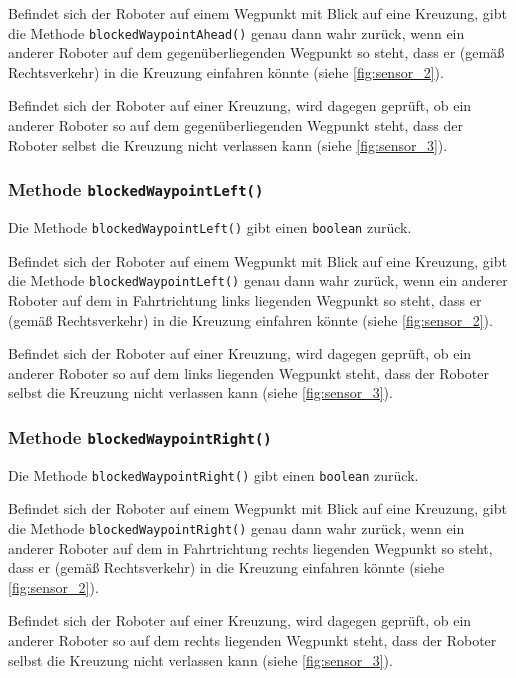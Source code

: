 Befindet sich der Roboter auf einem Wegpunkt mit Blick auf eine Kreuzung, gibt die Methode \texttt{blockedWaypointAhead()} genau dann wahr zurück, wenn ein anderer Roboter auf dem gegenüberliegenden Wegpunkt so steht, dass er (gemäß Rechtsverkehr) in die Kreuzung einfahren könnte (siehe \autoref{fig:sensor_2}).

Befindet sich der Roboter auf einer Kreuzung, wird dagegen geprüft, ob ein anderer Roboter so auf dem gegenüberliegenden Wegpunkt steht, dass der Roboter selbst die Kreuzung nicht verlassen kann (siehe \autoref{fig:sensor_3}).


\subsubsection{Methode \texttt{blockedWaypointLeft()}}

Die Methode \texttt{blockedWaypointLeft()} gibt einen \texttt{boolean} zurück.

Befindet sich der Roboter auf einem Wegpunkt mit Blick auf eine Kreuzung, gibt die Methode \texttt{blockedWaypointLeft()} genau dann wahr zurück, wenn ein anderer Roboter auf dem in Fahrtrichtung links liegenden Wegpunkt so steht, dass er (gemäß Rechtsverkehr) in die Kreuzung einfahren könnte (siehe \autoref{fig:sensor_2}).

Befindet sich der Roboter auf einer Kreuzung, wird dagegen geprüft, ob ein anderer Roboter so auf dem links liegenden Wegpunkt steht, dass der Roboter selbst die Kreuzung nicht verlassen kann (siehe \autoref{fig:sensor_3}).


\subsubsection{Methode \texttt{blockedWaypointRight()}}

Die Methode \texttt{blockedWaypointRight()} gibt einen \texttt{boolean} zurück.

Befindet sich der Roboter auf einem Wegpunkt mit Blick auf eine Kreuzung, gibt die Methode \texttt{blockedWaypointRight()} genau dann wahr zurück, wenn ein anderer Roboter auf dem in Fahrtrichtung rechts liegenden Wegpunkt so steht, dass er (gemäß Rechtsverkehr) in die Kreuzung einfahren könnte (siehe \autoref{fig:sensor_2}).

Befindet sich der Roboter auf einer Kreuzung, wird dagegen geprüft, ob ein anderer Roboter so auf dem rechts liegenden Wegpunkt steht, dass der Roboter selbst die Kreuzung nicht verlassen kann (siehe \autoref{fig:sensor_3}).

